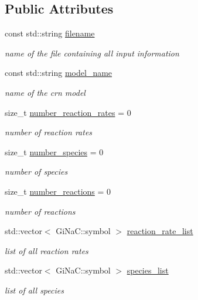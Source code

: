 \subsection*{Public Attributes}
\begin{DoxyCompactItemize}
\item 
const std\+::string \mbox{\hyperlink{classCRN_a4ef4514e0ffba7b9358b37636a7f7fb4}{filename}}
\begin{DoxyCompactList}\small\item\em name of the file containing all input information \end{DoxyCompactList}\item 
const std\+::string \mbox{\hyperlink{classCRN_a9ab0e43893870c6961fd0febafc99161}{model\+\_\+name}}
\begin{DoxyCompactList}\small\item\em name of the crn model \end{DoxyCompactList}\item 
size\+\_\+t \mbox{\hyperlink{classCRN_adb477d36059362ab2aa130af967275df}{number\+\_\+reaction\+\_\+rates}} = 0
\begin{DoxyCompactList}\small\item\em number of reaction rates \end{DoxyCompactList}\item 
size\+\_\+t \mbox{\hyperlink{classCRN_adbbcfed60a730f7d476678e3f0b2a843}{number\+\_\+species}} = 0
\begin{DoxyCompactList}\small\item\em number of species \end{DoxyCompactList}\item 
size\+\_\+t \mbox{\hyperlink{classCRN_a3f77c4dcba31c3889bbb4635ef423940}{number\+\_\+reactions}} = 0
\begin{DoxyCompactList}\small\item\em number of reactions \end{DoxyCompactList}\item 
std\+::vector$<$ Gi\+Na\+C\+::symbol $>$ \mbox{\hyperlink{classCRN_af6de0bba7b97843f9c95e4e849fa9543}{reaction\+\_\+rate\+\_\+list}}
\begin{DoxyCompactList}\small\item\em list of all reaction rates \end{DoxyCompactList}\item 
std\+::vector$<$ Gi\+Na\+C\+::symbol $>$ \mbox{\hyperlink{classCRN_ab1e7f09d6d0cf644190d36f14e689f49}{species\+\_\+list}}
\begin{DoxyCompactList}\small\item\em list of all species \end{DoxyCompactList}\item 

\end{DoxyCompactItemize}
